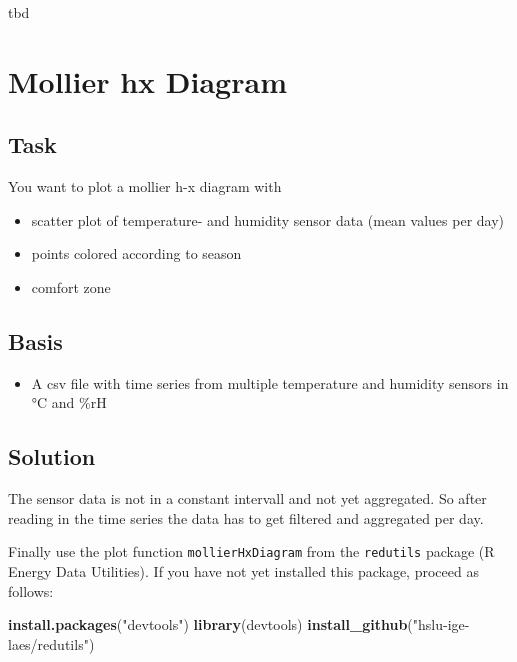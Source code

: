 \documentclass[
]{book}
\newenvironment{Shaded}{\begin{snugshade}}{\end{snugshade}}
\newcommand{\KeywordTok}[1]{\textcolor[rgb]{0.13,0.29,0.53}{\textbf{#1}}}
\newcommand{\NormalTok}[1]{#1}
\newcommand{\StringTok}[1]{\textcolor[rgb]{0.31,0.60,0.02}{#1}}
\providecommand{\tightlist}{%
  \setlength{\itemsep}{0pt}\setlength{\parskip}{0pt}}
\let\oldShaded\Shaded
\let\endoldShaded\endShaded
\renewenvironment{Shaded}{\footnotesize\oldShaded}{\endoldShaded}
\begin{document}
tbd

\hypertarget{mollier-hx-diagram}{%
\section{Mollier hx Diagram}\label{mollier-hx-diagram}}

\hypertarget{task-1}{%
\subsection{Task}\label{task-1}}

You want to plot a mollier h-x diagram with

\begin{itemize}
\item
  scatter plot of temperature- and humidity sensor data (mean values per day)
\item
  points colored according to season
\item
  comfort zone
\end{itemize}

\hypertarget{basis-2}{%
\subsection{Basis}\label{basis-2}}

\begin{itemize}
\tightlist
\item
  A csv file with time series from multiple temperature and humidity sensors in °C and \%rH
\end{itemize}

\hypertarget{solution-6}{%
\subsection{Solution}\label{solution-6}}

The sensor data is not in a constant intervall and not yet aggregated. So after reading in the time series the data has to get filtered and aggregated per day.

Finally use the plot function \texttt{mollierHxDiagram} from the \texttt{redutils} package (R Energy Data Utilities).
If you have not yet installed this package, proceed as follows:

\begin{Shaded}
\begin{Highlighting}[]
\KeywordTok{install.packages}\NormalTok{(}\StringTok{"devtools"}\NormalTok{)}
\KeywordTok{library}\NormalTok{(devtools)}
\KeywordTok{install_github}\NormalTok{(}\StringTok{"hslu-ige-laes/redutils"}\NormalTok{)}
\end{Highlighting}
\end{Shaded}
\end{document}
